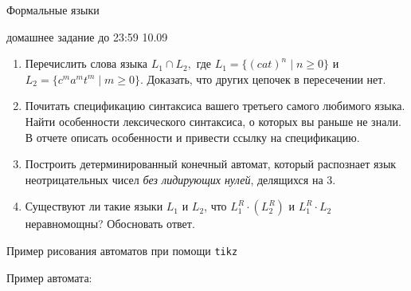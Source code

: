 \documentclass[12pt]{article}
\begin{document}
\begin{center} {\LARGE Формальные языки} \end{center}

\begin{center} \Large домашнее задание до 23:59 10.09 \end{center}
\bigskip

\begin{enumerate}
  \item
  {
    Перечислить слова языка $L_1 \cap L_2,$ где $L_1 = \{ (cat)^n \mid n \geq 0 \}$ и $L_2 = \{ c^m a^m t^m \mid m \geq 0 \}$. Доказать, что других цепочек в пересечении нет.
  }
  \item
  {
    Почитать спецификацию синтаксиса вашего третьего самого любимого языка. Найти особенности лексического синтаксиса, о которых вы раньше не знали. В отчете описать особенности и привести ссылку на спецификацию.
  }
  \item
  {
    Построить детерминированный конечный автомат, который распознает язык неотрицательных чисел \emph{без лидирующих нулей}, делящихся на 3.
  }
  \item
  {
    Существуют ли такие языки $L_1$ и $L_2$, что $L_1^R \cdot (L_2^R)$ и $L_1^R \cdot L_2$ неравномощны? Обосновать ответ.
  }
\end{enumerate}

\newpage

\begin{center}
  \Large{Пример рисования автоматов при помощи \texttt{tikz}}
\end{center}

\bigskip

Пример автомата:
\end{document}

